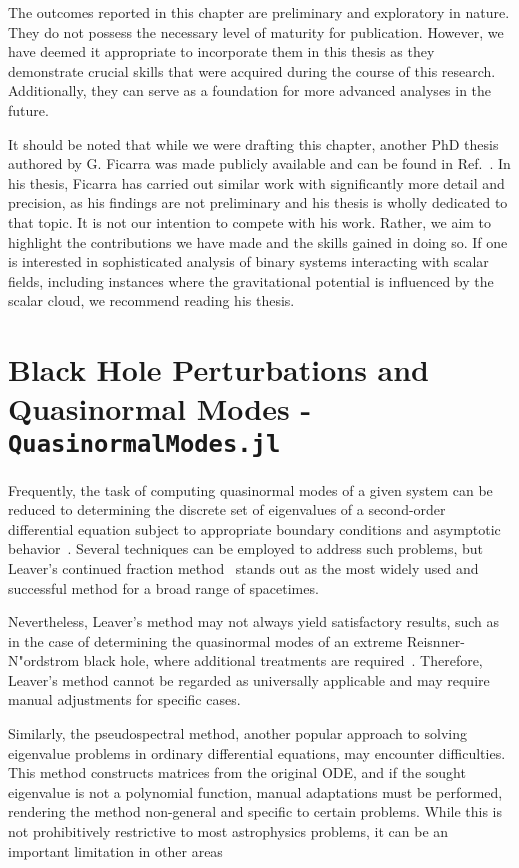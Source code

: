 The outcomes reported in this chapter are preliminary and exploratory in nature. They do not possess the necessary level of maturity for publication. However, we have deemed it appropriate to incorporate them in this thesis as they demonstrate crucial skills that were acquired during the course of this research. Additionally, they can serve as a foundation for more advanced analyses in the future.

It should be noted that while we were drafting this chapter, another PhD thesis authored by G. Ficarra was made publicly available and can be found in Ref.~\cite{Ficarra2023}. In his thesis, Ficarra has carried out similar work with significantly more detail and precision, as his findings are not preliminary and his thesis is wholly dedicated to that topic. It is not our intention to compete with his work. Rather, we aim to highlight the contributions we have made and the skills gained in doing so. If one is interested in sophisticated analysis of binary systems interacting with scalar fields, including instances where the gravitational potential is influenced by the scalar cloud, we recommend reading his thesis.

\section{Black Hole Perturbations and Quasinormal Modes - \texttt{QuasinormalModes.jl}}

Frequently, the task of computing quasinormal modes of a given system can be reduced to determining the discrete set of eigenvalues of a second-order differential equation subject to appropriate boundary conditions and asymptotic behavior~\cite{review3}. Several techniques can be employed to address such problems, but Leaver's continued fraction method~\cite{Leaver1985} stands out as the most widely used and successful method for a broad range of spacetimes.

Nevertheless, Leaver's method may not always yield satisfactory results, such as in the case of determining the quasinormal modes of an extreme Reisnner-N"ordstrom black hole, where additional treatments are required~\cite{PhysRevD.93.064062}. Therefore, Leaver's method cannot be regarded as universally applicable and may require manual adjustments for specific cases.

Similarly, the pseudospectral method, another popular approach to solving eigenvalue problems in ordinary differential equations, may encounter difficulties. This method constructs matrices from the original \ac{ODE}, and if the sought eigenvalue is not a polynomial function, manual adaptations must be performed, rendering the method non-general and specific to certain problems. While this is not prohibitively restrictive to most astrophysics problems, it can be an important limitation in other areas

